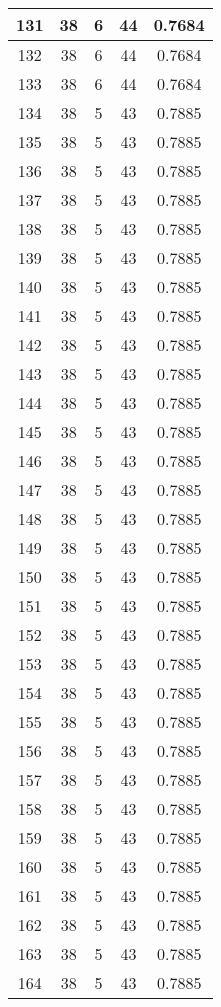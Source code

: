 \documentclass[letterpaper, 12pt]{article}
\begin{document}
\begin{longtable}{|c|c|c|c|c|}
\hline
131 & 38 & 6 & 44 & 0.7684 \\
\hline
132 & 38 & 6 & 44 & 0.7684 \\
\hline
133 & 38 & 6 & 44 & 0.7684 \\
\hline
134 & 38 & 5 & 43 & 0.7885 \\
\hline
135 & 38 & 5 & 43 & 0.7885 \\
\hline
136 & 38 & 5 & 43 & 0.7885 \\
\hline
137 & 38 & 5 & 43 & 0.7885 \\
\hline
138 & 38 & 5 & 43 & 0.7885 \\
\hline
139 & 38 & 5 & 43 & 0.7885 \\
\hline
140 & 38 & 5 & 43 & 0.7885 \\
\hline
141 & 38 & 5 & 43 & 0.7885 \\
\hline
142 & 38 & 5 & 43 & 0.7885 \\
\hline
143 & 38 & 5 & 43 & 0.7885 \\
\hline
144 & 38 & 5 & 43 & 0.7885 \\
\hline
145 & 38 & 5 & 43 & 0.7885 \\
\hline
146 & 38 & 5 & 43 & 0.7885 \\
\hline
147 & 38 & 5 & 43 & 0.7885 \\
\hline
148 & 38 & 5 & 43 & 0.7885 \\
\hline
149 & 38 & 5 & 43 & 0.7885 \\
\hline
150 & 38 & 5 & 43 & 0.7885 \\
\hline
151 & 38 & 5 & 43 & 0.7885 \\
\hline
152 & 38 & 5 & 43 & 0.7885 \\
\hline
153 & 38 & 5 & 43 & 0.7885 \\
\hline
154 & 38 & 5 & 43 & 0.7885 \\
\hline
155 & 38 & 5 & 43 & 0.7885 \\
\hline
156 & 38 & 5 & 43 & 0.7885 \\
\hline
157 & 38 & 5 & 43 & 0.7885 \\
\hline
158 & 38 & 5 & 43 & 0.7885 \\
\hline
159 & 38 & 5 & 43 & 0.7885 \\
\hline
160 & 38 & 5 & 43 & 0.7885 \\
\hline
161 & 38 & 5 & 43 & 0.7885 \\
\hline
162 & 38 & 5 & 43 & 0.7885 \\
\hline
163 & 38 & 5 & 43 & 0.7885 \\
\hline
164 & 38 & 5 & 43 & 0.7885 \\

\end{longtable}
\end{document}
